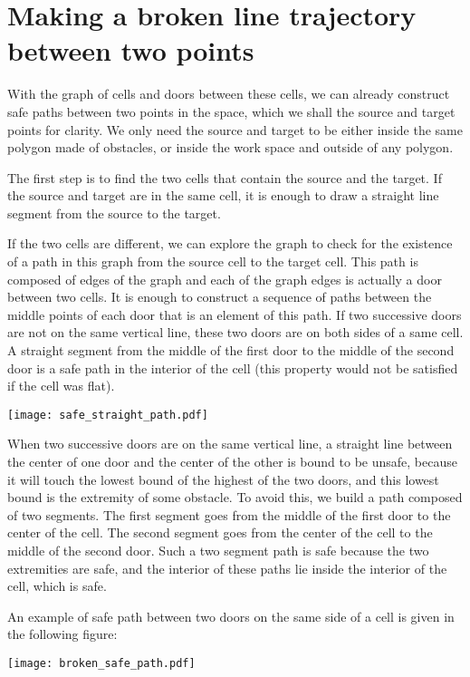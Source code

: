 \documentclass{easychair}
\begin{document}
\section{Making a broken line trajectory between two points}
With the graph of cells and doors between these cells, we can already
construct safe paths between two points in the space, which we shall
the source and target points for clarity.  We only need the source and
target to be either inside the same polygon made of obstacles, or
inside the work space and outside of any polygon.

The first step is to find the two cells that contain the source and
the target.  If the source and target are in the same cell, it is
enough to draw a straight line segment from the source to the target.

If the two cells are different, we can explore the graph to check for
the existence of a path in this graph from the source cell to the
target cell.  This path is composed of edges of the graph and each of
the graph edges is actually a door between two cells.  It is enough to
construct a sequence of paths between the middle points of each door
that is an element of this path.  If two successive doors are not on the same
vertical line, these two doors are on both sides of a same cell.  A
straight segment from the middle of the first door to the middle of
the second door is a safe path in the interior of the cell (this
property would not be satisfied if the cell was flat).

\begin{center}
\texttt{[image: safe\_straight\_path.pdf]}
\end{center}


When two successive doors are on the same vertical line, a straight
line between the center of one door and the center of the other is
bound to be unsafe, because it will touch the lowest bound of the
highest of the two doors, and this lowest bound is the extremity of
some obstacle.  To avoid this, we build a path composed of two
segments.  The first segment goes from the middle of the first door to
the center of the cell.  The second segment goes from the center of
the cell to the middle of the second door.  Such a two segment path is
safe because the two extremities are safe, and the interior of these
paths lie inside the interior of the cell, which is safe.

An example of safe path between two doors on the same side of a cell is
given in the following figure:
\begin{center}
\texttt{[image: broken\_safe\_path.pdf]}
\end{center}
\end{document}
